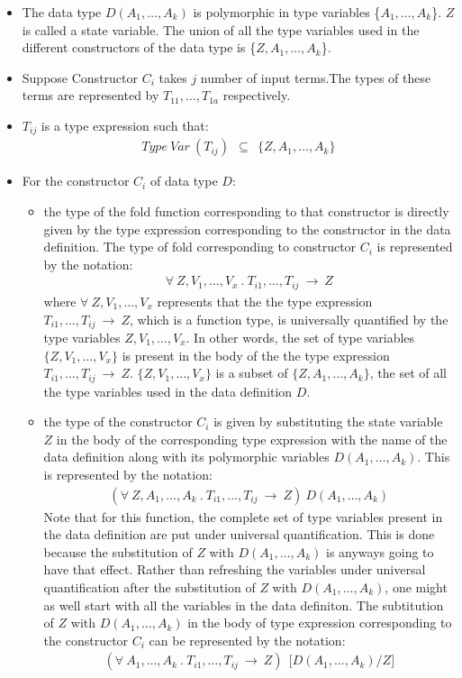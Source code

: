 \documentclass[11pt]{article}
\begin{document}
\begin{itemize}
  \item The data type $D(A_1,\ldots,A_k)$ is polymorphic in type variables \{$A_1,\ldots,A_k$\}. ${Z}$ is called a state variable. The union of all the type variables used in the different constructors of the data type is \{${Z,A_1,\ldots,A_k}$\}.
  \item Suppose Constructor ${C_i}$ takes $j$ number of input terms.The types of these terms are represented by ${T_{11},\ldots,T_{1a}}$   respectively.
  \item ${T_{ij}}$ is a type expression such that:
\begin{align*}
Type~Var~(T_{ij})~~\subseteq~~ \{Z,A_1,\ldots,A_k\}
\end{align*}
\item For the constructor ${C_i}$ of data type ${D}$:
\begin{itemize}
  \item the type of the {\sf fold} function corresponding to that constructor is directly given by the type expression corresponding to the constructor in the data definition. The type of fold corresponding to constructor ${C_i}$ is represented by the notation:
  \begin{align}
    \forall~Z,V_1,\ldots,V_x~.~T_{i1},\ldots,T_{ij}~\to~Z
  \end{align}
  where $\forall~Z,V_1,\ldots,V_x$ represents that the the type expression $T_{i1},\ldots,T_{ij}~\to~Z$, which is a function type, is universally quantified by the type variables $Z,V_1,\ldots,V_x$. In other words, the  set of type variables  $\{Z,V_1,\ldots,V_x\}$ is present in the body of the the type expression $T_{i1},\ldots,T_{ij}~\to~Z$. $\{Z,V_1,\ldots,V_x\}$ is a subset of $\{Z,A_1,\ldots,A_k\}$, the set of all the type variables used in the data definition $D$. 
  \item the type of the constructor ${C_i}$ is given by substituting the state variable $Z$ in the body of the corresponding type expression with the name of the data definition along with its polymorphic variables $D(A_1,\ldots,A_k)$. This is represented by the notation:
  \begin{align*}
    (\forall~Z,A_1,\ldots,A_k~.~T_{i1},\ldots,T_{ij}~\to~Z)~D(A_1,\ldots,A_k)
  \end{align*}
 Note that for this function, the complete set of type variables present in the data definition are put under universal quantification. This is done because the substitution of $Z$ with $D(A_1,\ldots,A_k)$ is anyways going to have that effect. Rather than refreshing the variables under universal quantification after the substitution of $Z$ with $D(A_1,\ldots,A_k)$, one might as well start with all the variables in the data definiton. The subtitution of $Z$ with $D(A_1,\ldots,A_k)$ in the body of type expression corresponding to the constructor $C_i$ can be represented by the notation:
 \begin{align}
    (\forall~A_1,\ldots,A_k~.~T_{i1},\ldots,T_{ij}~\to~Z)~~\Big[D(A_1,\ldots,A_k)/Z\Big]
  \end{align}
\end{itemize}
\end{itemize}
\end{document}

